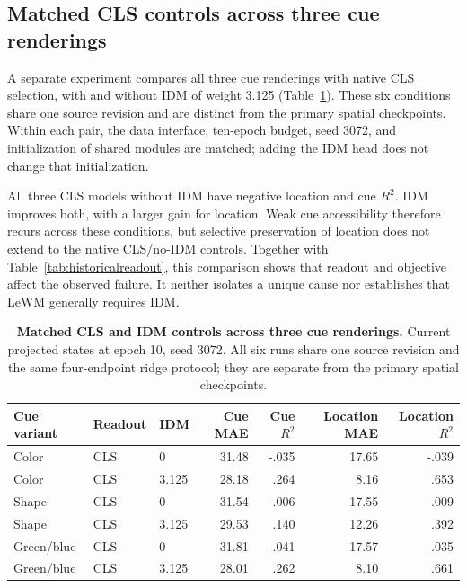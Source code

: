 \subsection{Matched CLS controls across three cue renderings}

A separate experiment compares all three cue renderings with native CLS
selection, with and without IDM of weight 3.125
(Table~\ref{tab:matchedidm}). These six conditions share one source revision
and are distinct from the primary spatial checkpoints. Within each pair,
the data interface, ten-epoch budget, seed 3072, and initialization of shared
modules are matched; adding the IDM head does not change that initialization.

All three CLS models without IDM have negative location and cue $R^2$.
IDM improves both, with a larger gain for location. Weak cue accessibility
therefore recurs across these conditions, but selective preservation of
location does not extend to the native CLS/no-IDM controls. Together with
Table~\ref{tab:historicalreadout}, this comparison shows that readout and
objective affect the observed failure. It neither isolates a unique cause
nor establishes that LeWM generally requires IDM.

\begin{table}[ht]
\centering
\caption{\textbf{Matched CLS and IDM controls across three cue renderings.}
Current projected states at epoch 10, seed 3072. All six runs share one source
revision and the same four-endpoint ridge protocol; they are separate from
the primary spatial checkpoints.}
\label{tab:matchedidm}
\renewcommand{\arraystretch}{1.12}
\setlength{\tabcolsep}{3pt}
\begin{tabular*}{\linewidth}{@{\extracolsep{\fill}}lllrrrr@{}}
\toprule
Cue variant & Readout & IDM & Cue MAE & Cue $R^2$ & Location MAE & Location $R^2$ \\
\midrule
Color & CLS & 0 & 31.48 & -.035 & 17.65 & -.039 \\
Color & CLS & 3.125 & 28.18 & .264 & 8.16 & .653 \\
Shape & CLS & 0 & 31.54 & -.006 & 17.55 & -.009 \\
Shape & CLS & 3.125 & 29.53 & .140 & 12.26 & .392 \\
Green/blue & CLS & 0 & 31.81 & -.041 & 17.57 & -.035 \\
Green/blue & CLS & 3.125 & 28.01 & .262 & 8.10 & .661 \\
\bottomrule
\end{tabular*}
\end{table}

